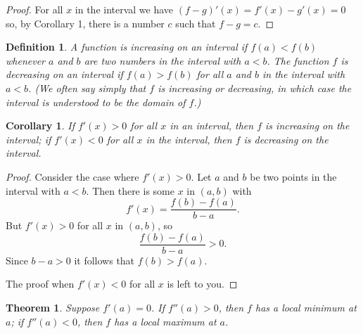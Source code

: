 \documentclass{article}
\newtheorem{corollary}{Corollary}
\newtheorem{definition}{Definition}
\newtheorem{theorem}{Theorem}
\begin{document}
\begin{proof}
  For all $x$ in the interval we have $(f - g)'(x) = f'(x) - g'(x) = 0$ so, by
  Corollary 1, there is a number $c$ such that $f - g = c$.
\end{proof}

\begin{definition}
  A function is \emph{increasing} on an interval if $f(a) < f(b)$ whenever $a$
  and $b$ are two numbers in the interval with $a < b$. The function $f$ is
  \emph{decreasing} on an interval if $f(a) > f(b)$ for all $a$ and $b$ in the
  interval with $a < b$. (We often say simply that $f$ is increasing or
  decreasing, in which case the interval is understood to be the domain of
  $f$.)
\end{definition}

\begin{corollary}
  If $f'(x) > 0$ for all $x$ in an interval, then $f$ is increasing on the
  interval; if $f'(x) < 0$ for all $x$ in the interval, then $f$ is decreasing
  on the interval.
\end{corollary}

\begin{proof}
  Consider the case where $f'(x) > 0$. Let $a$ and $b$ be two points in the
  interval with $a < b$. Then there is some $x$ in $(a, b)$ with
  \begin{equation*}
    f'(x) = \frac{f(b) - f(a)}{b - a}.
  \end{equation*} But $f'(x) > 0$ for all $x$ in $(a, b)$, so \begin{equation*}
    \frac{f(b) - f(a)}{b - a} > 0.
  \end{equation*} Since $b - a > 0$ it follows that $f(b) > f(a)$.

  The proof when $f'(x) < 0$ for all $x$ is left to you.
\end{proof}

\begin{theorem}
  Suppose $f'(a) = 0$. If $f''(a) > 0$, then $f$ has a local minimum at $a$; if
  $f''(a) < 0$, then $f$ has a local maximum at $a$.
\end{theorem}
\end{document}
